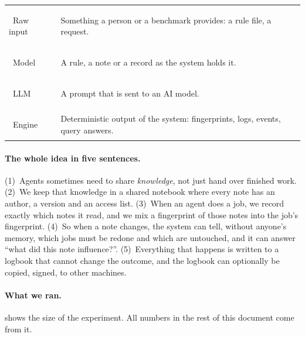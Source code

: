 \documentclass[10pt,a4paper]{article}
\begin{document}
\begin{center}
\small
\begin{tabular}{@{}l p{11.5cm}@{}}
\toprule
\colorbox{rawbg}{\strut\ Raw input\ } & Something a person or a benchmark provides: a rule file, a request. \\
\colorbox{modelbg}{\strut\ Model\ } & A rule, a note or a record as the system holds it. \\
\colorbox{llmbg}{\strut\ LLM\ } & A prompt that is sent to an AI model. \\
\colorbox{enginebg}{\strut\ Engine\ } & Deterministic output of the system: fingerprints, logs, events, query answers. \\
\bottomrule
\end{tabular}
\end{center}

\paragraph{The whole idea in five sentences.}
(1)~Agents sometimes need to share \emph{knowledge}, not just hand over finished work.
(2)~We keep that knowledge in a shared notebook where every note has an author, a version and an
access list.
(3)~When an agent does a job, we record exactly which notes it read, and we mix a fingerprint of those
notes into the job's fingerprint.
(4)~So when a note changes, the system can tell, without anyone's memory, which jobs must be redone and
which are untouched, and it can answer ``what did this note influence?''.
(5)~Everything that happens is written to a logbook that cannot change the outcome, and the logbook can
optionally be copied, signed, to other machines.

\paragraph{What we ran.}
 shows the size of the experiment. All numbers in the rest of this document come from it.
\end{document}

